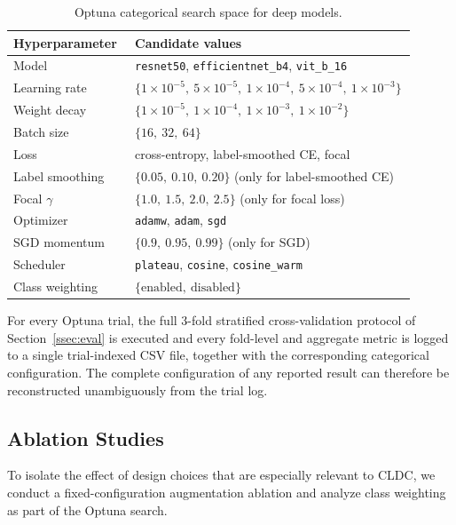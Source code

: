 \documentclass[conference]{IEEEtran}
\begin{document}
\begin{table}[t]
\centering
\caption{Optuna categorical search space for deep models.}
\label{tab:search_space}
\renewcommand{\arraystretch}{1.2}
\begin{tabular}{p{0.30\linewidth}p{0.60\linewidth}}
\toprule
\textbf{Hyperparameter} & \textbf{Candidate values} \\
\midrule
Model              & \texttt{resnet50}, \texttt{efficientnet\_b4}, \texttt{vit\_b\_16} \\
Learning rate      & $\{1{\times}10^{-5},\ 5{\times}10^{-5},\ 1{\times}10^{-4},\ 5{\times}10^{-4},\ 1{\times}10^{-3}\}$ \\
Weight decay       & $\{1{\times}10^{-5},\ 1{\times}10^{-4},\ 1{\times}10^{-3},\ 1{\times}10^{-2}\}$ \\
Batch size         & $\{16,\ 32,\ 64\}$ \\
Loss               & cross-entropy, label-smoothed CE, focal \\
Label smoothing    & $\{0.05,\ 0.10,\ 0.20\}$ (only for label-smoothed CE) \\
Focal $\gamma$     & $\{1.0,\ 1.5,\ 2.0,\ 2.5\}$ (only for focal loss) \\
Optimizer          & \texttt{adamw}, \texttt{adam}, \texttt{sgd} \\
SGD momentum       & $\{0.9,\ 0.95,\ 0.99\}$ (only for SGD) \\
Scheduler          & \texttt{plateau}, \texttt{cosine}, \texttt{cosine\_warm} \\
Class weighting    & $\{\text{enabled},\ \text{disabled}\}$ \\
\bottomrule
\end{tabular}
\end{table}

For every Optuna trial, the full 3-fold stratified cross-validation protocol of Section~\ref{ssec:eval} is executed and every fold-level and aggregate metric is logged to a single trial-indexed CSV file, together with the corresponding categorical configuration. The complete configuration of any reported result can therefore be reconstructed unambiguously from the trial log.

\subsection{Ablation Studies}
\label{ssec:ablation}

To isolate the effect of design choices that are especially relevant to CLDC, we conduct a fixed-configuration augmentation ablation and analyze class weighting as part of the Optuna search.
\end{document}
